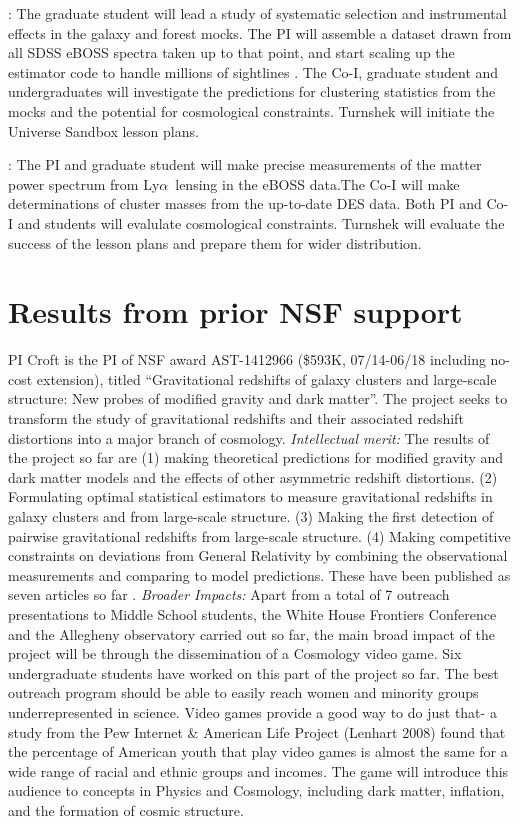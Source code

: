 \documentclass[12pt]{article}
\def\lya{Ly$\alpha$}
\begin{document}
\begin{small}
:
The graduate
student will lead a study of systematic selection and 
instrumental effects in the galaxy and forest
mocks. The PI will assemble a dataset drawn from
all SDSS eBOSS spectra taken up to that point, and start
scaling up the estimator code to handle millions of sightlines .
  The Co-I, graduate student and undergraduates will investigate
the predictions for clustering statistics from the mocks
and the potential for cosmological constraints. 
Turnshek will initiate the Universe Sandbox lesson plans. 

: 
The PI and graduate student will make precise measurements of
the matter power spectrum from \lya\ lensing in the eBOSS
data.The Co-I will make  determinations of cluster masses
from the up-to-date DES data. Both PI and Co-I and  students
will evalulate cosmological constraints.
Turnshek will evaluate the success of
 the lesson plans and prepare them for wider distribution.

\section{Results from prior NSF support}

PI Croft is the PI of NSF award AST-1412966 (\$593K, 07/14-06/18
including no-cost extension), titled ``Gravitational redshifts of
galaxy clusters and large-scale structure: New probes of modified
gravity and dark matter''.  The project seeks to transform the study
of gravitational redshifts and their associated redshift distortions
into a major branch of cosmology.  {\it Intellectual merit:} The
results of the project so far are (1) making theoretical predictions
for modified gravity and dark matter models and the effects of other
asymmetric redshift distortions.  (2) Formulating optimal statistical
estimators to measure gravitational redshifts in galaxy clusters and
from large-scale structure.  (3) Making the first detection of
pairwise gravitational redshifts from large-scale structure. (4)
Making competitive constraints on deviations from General Relativity
by combining the observational measurements and comparing to model
predictions. These have been published as seven articles so far
\citep{2015MNRAS.453.1754A,2017MNRAS.471.2345Z,2017MNRAS.471.2077A,2017MNRAS.470.2822A,2017arXiv170907854G,2017MNRAS.465.4853A,2016MNRAS.456.3743A}. {\it
  Broader Impacts:} Apart from a total of 7 outreach presentations to
Middle School students, the White House Frontiers Conference and the
Allegheny observatory carried out so far, the main broad impact of the
project will be through the dissemination of a Cosmology video
game. Six undergraduate students have worked on this part of the
project so far.  The best outreach program should be able to easily
reach women and minority groups underrepresented in science. Video
games provide a good way to do just that- a study from the Pew
Internet \& American Life Project (Lenhart 2008) found that the
percentage of American youth that play video games is almost the same
for a wide range of racial and ethnic groups and incomes.  The game
will introduce this audience to concepts in Physics and Cosmology,
including dark matter, inflation, and the formation of cosmic
structure.



\end{small}
\end{document}
